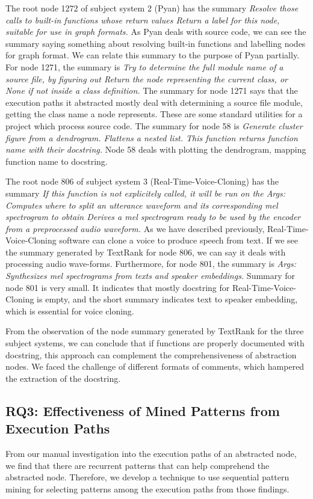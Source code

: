  
The root node 1272 of subject system 2 (Pyan) has the summary \textit{Resolve those calls to built-in functions whose return values Return a label for this node, suitable for use in graph formats.} As Pyan deals with source code, we can see the summary saying something about resolving built-in functions and labelling nodes for graph format. We can relate this summary to the purpose of Pyan partially. For node 1271, the summary is \textit{Try to determine the full module name of a source file, by figuring out       Return the node representing the current class, or None if not inside a class definition.}
The summary for node 1271 says that the execution paths it abstracted mostly deal with determining a source file module, getting the class name a node represents. These are some standard utilities for a project which process source code. The summary for node 58 is \textit{Generate cluster figure from a dendrogram. Flattens a nested list. This function returns function name with their docstring.} Node 58 deals with plotting the dendrogram, mapping function name to docstring.

The root node 806 of subject system 3 (Real-Time-Voice-Cloning) has the summary \textit{If this function is not explicitely called, it will be run on the Args:                  Computes where to split an utterance waveform and its corresponding mel spectrogram to obtain   Derives a mel spectrogram ready to be used by the encoder from a preprocessed audio waveform.} As we have described previously, Real-Time-Voice-Cloning software can clone a voice to produce speech from text. If we see the summary generated by TextRank for node 806, we can say it deals with processing audio wave-forms. Furthermore, for node 801, the summary is \textit{Args:   Synthesizes mel spectrograms from texts and speaker embeddings.} Summary for node 801 is very small. It indicates that mostly docstring for Real-Time-Voice-Cloning is empty, and the short summary indicates text to speaker embedding, which is essential for voice cloning.

From the observation of the node summary generated by TextRank for the three subject systems, we can conclude that if functions are properly documented with docstring, this approach can complement the comprehensiveness of abstraction nodes. We faced the challenge of different formats of comments, which hampered the extraction of the docstring.  
 

\subsection{ RQ3: Effectiveness of Mined Patterns from Execution Paths}
From our manual investigation into the execution paths of an abstracted node, we find that there are recurrent patterns that can help comprehend the abstracted node. Therefore, we develop a technique to use sequential pattern mining for selecting patterns among the execution paths from those findings. 

